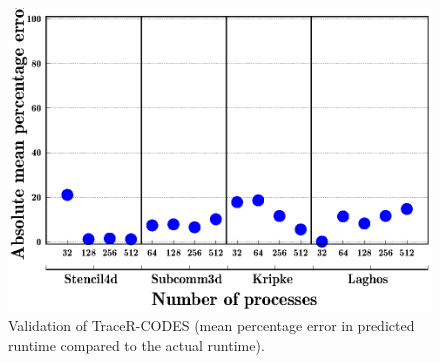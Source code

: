 \begin{figure}[h]
\centering
\includegraphics[width=\columnwidth]{figure/val/quartz.eps}
\caption{Validation of TraceR-CODES (mean percentage error in predicted runtime compared to the actual runtime).}
\label{fig:validation}
\end{figure}

